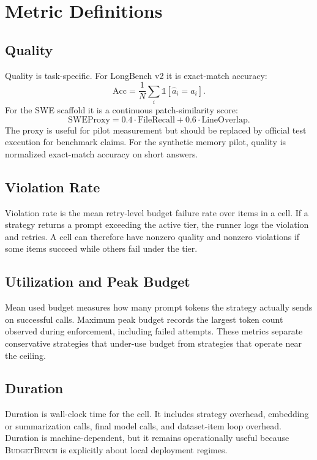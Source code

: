 \documentclass[11pt]{article}
\newcommand{\BudgetBench}{\textsc{BudgetBench}}
\begin{document}
\section{Metric Definitions}

\subsection{Quality}

Quality is task-specific.  For LongBench v2 it is exact-match accuracy:
\[
  \mathrm{Acc} = \frac{1}{N}\sum_i \mathbb{1}[\hat{a}_i = a_i].
\]
For the SWE scaffold it is a continuous patch-similarity score:
\[
  \mathrm{SWEProxy} = 0.4 \cdot \mathrm{FileRecall} + 0.6 \cdot \mathrm{LineOverlap}.
\]
The proxy is useful for pilot measurement but should be replaced by official
test execution for benchmark claims.
For the synthetic memory pilot, quality is normalized exact-match accuracy on
short answers.

\subsection{Violation Rate}

Violation rate is the mean retry-level budget failure rate over items in a
cell.  If a strategy returns a prompt exceeding the active tier, the runner
logs the violation and retries.  A cell can therefore have nonzero quality and
nonzero violations if some items succeed while others fail under the tier.

\subsection{Utilization and Peak Budget}

Mean used budget measures how many prompt tokens the strategy actually sends
on successful calls.  Maximum peak budget records the largest token count
observed during enforcement, including failed attempts.  These metrics separate
conservative strategies that under-use budget from strategies that operate
near the ceiling.

\subsection{Duration}

Duration is wall-clock time for the cell.  It includes strategy overhead,
embedding or summarization calls, final model calls, and dataset-item loop
overhead.  Duration is machine-dependent, but it remains operationally useful
because \BudgetBench{} is explicitly about local deployment regimes.
\end{document}
